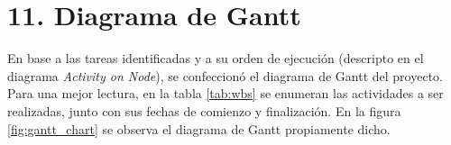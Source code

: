\documentclass[
11pt, %
]{charter}
\begin{document}
\section{11. Diagrama de Gantt}
\label{sec:gantt}
En base a las tareas identificadas y a su orden de ejecución (descripto en el diagrama \textit{Activity on Node}), se confeccionó el diagrama de Gantt del proyecto. Para una mejor lectura, en la tabla \ref{tab:wbs} se enumeran las actividades a ser realizadas, junto con sus fechas de comienzo y finalización.  En la figura \ref{fig:gantt_chart} se observa el diagrama de Gantt propiamente dicho.
%		
\end{document}
